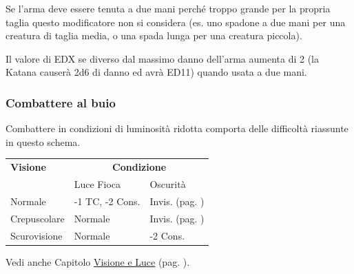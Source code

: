 \begin{multicols}{2}
Se l'arma deve essere tenuta a due mani perché troppo grande per la propria taglia questo modificatore non si considera (es. uno spadone a due mani per una creatura di taglia media, o una spada lunga per una creatura piccola).

Il valore di EDX se diverso dal massimo danno dell'arma aumenta di 2 (la Katana causerà 2d6 di danno ed avrà ED11) quando usata a due mani.

\subsubsection{Combattere al buio}

Combattere in condizioni di luminosità ridotta comporta delle difficoltà riassunte in questo schema.

\medskip

\noindent\begin{tabular}{lll}
	\toprule
\rowcolor{gray!20}\textbf{Visione} & \multicolumn{2}{c}{\textbf{Condizione}}\\
& Luce Fioca & Oscurità\\
\toprule
Normale & -1 TC, -2 Cons. & Invis. (pag. \pageref{invisibilita})\\
\rowcolor{gray!20}Crepuscolare & Normale & Invis. (pag. \pageref{invisibilita})\\
Scurovisione & Normale & -2 Cons.
\end{tabular}

\medskip

Vedi anche Capitolo \hyperlink{visioneeluce}{Visione e Luce} (pag. \pageref{visioneeluce}).



\end{multicols}
